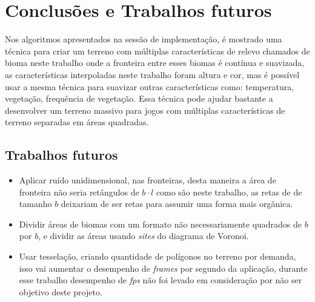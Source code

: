 \chapter{Conclusões e Trabalhos futuros}
Nos algoritmos apresentados na sessão de implementação, é mostrado uma técnica para 
criar um terreno com múltiplas características de relevo chamados de bioma neste trabalho
onde a fronteira entre esses biomas é contínua e suavizada, as características interpoladas
neste trabalho foram altura e cor, mas é possível usar a mesma técnica para suavizar
outras características como: temperatura, vegetação, frequência de vegetação.
Essa técnica pode ajudar bastante a desenvolver um terreno massivo para jogos com
múltiplas características de terreno separadas em áreas quadradas.

\section{Trabalhos futuros}

\begin{itemize}
    \item Aplicar ruído unidimensional, nas fronteiras, desta maneira a área de fronteira
    não seria retângulos de $b \cdot l$ como são neste trabalho, as retas de de tamanho
    $b$ deixariam de ser retas para assumir uma forma mais orgânica.
    \item Dividir áreas de biomas com um formato não necessariamente quadrados de $b$ por $b$, 
    e dividir as áreas usando \textit{sites} do diagrama de Voronoi.
    \item Usar tesselação, criando quantidade de polígonos no terreno por demanda, 
    isso vai aumentar o desempenho de \textit{frames} por segundo da aplicação, durante esse trabalho 
    desempenho de \textit{fps} não foi levado em consideração por não ser objetivo deste projeto.
    
\end{itemize}